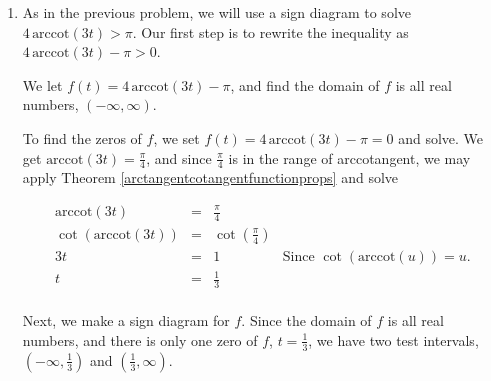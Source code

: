 \documentclass{ximera}
\begin{document}
\begin{example}
\begin{explanation}
\begin{enumerate}
\begin{image}
\end{image}


Since we are looking for where $f(x) = \pi^2-4\arccos^{2}(x) < 0$, our answer is $[-1,0)$.  

 

Geometrically,  we find the graph of $y = \pi^2-4\arccos^{2}(x)$ is below $y = 0$ (the $x$-axis) on $[-1,0)$.



\begin{center}
\end{center}


\item   As in the previous problem, we will use a sign diagram to solve $4 \, \text{arccot}(3t) > \pi$.  Our first step is to rewrite the inequality as $4 \, \text{arccot}(3t) -  \pi > 0$. 

 

We let $f(t) = 4 \, \text{arccot}(3t) -  \pi$, and find the domain of $f$ is all real numbers, $(-\infty, \infty)$.  

 

To find the zeros of $f$, we set $f(t) = 4 \, \text{arccot}(3t) -  \pi = 0$ and solve.  We get $\text{arccot}(3t) = \frac{\pi}{4}$, and since $\frac{\pi}{4}$ is in the range of arccotangent, we may apply Theorem \ref{arctangentcotangentfunctionprops} and solve 

\[ \begin{array}{rclr}

\text{arccot}(3t) & = & \frac{\pi}{4} & \\
\cot(\text{arccot}(3t)) & = & \cot\left(\frac{\pi}{4}\right) & \\
3t & = & 1 & \text{Since $\cot(\text{arccot}(u)) = u$.} \\
t & = & \frac{1}{3} &  \\ \end{array}\]


Next, we make a sign diagram for $f$.  Since the domain of $f$ is all real numbers, and there is only one zero of $f$, $t = \frac{1}{3}$, we have two test intervals, $\left(-\infty, \frac{1}{3}\right)$ and  $\left(\frac{1}{3}, \infty \right)$.

 


\end{enumerate}
\end{explanation}
\end{example}
\end{document}
